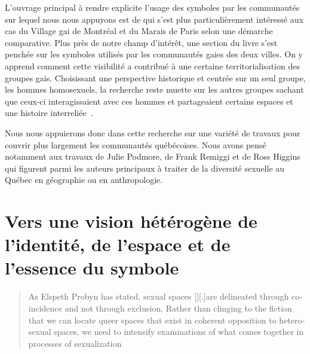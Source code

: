 L'ouvrage principal à rendre explicite l'usage des symboles par les communautés \lgbt{} sur lequel nous nous appuyons est  de \citet{Giraud2014} qui s'est plus particulièrement intéressé aux cas du Village gai de Montréal et du Marais de Paris selon une démarche comparative.
Plus près de notre champ d'intérêt, une section du livre s'est penchée sur les symboles utilisés par les communautés gaies des deux villes.
On y apprend comment cette visibilité a contribué à une certaine territorialisation des groupes gais.
Choisissant une perspective historique et centrée sur un seul groupe, les hommes homosexuels, la recherche reste muette sur les autres groupes \lgbt{} sachant que ceux-ci interagissaient avec ces hommes et partageaient certains espaces et une histoire interreliée~\citep{Remiggi2000,Demczuk1998,Podmore2001,Higgins1997,Higgins1999}.

Nous nous appuierons donc dans cette recherche sur une variété de travaux pour couvrir plus largement les communautés \lgbt{} québécoises.
Nous avons pensé notamment aux travaux de Julie Podmore, de Frank Remiggi et de Ross Higgins qui figurent parmi les auteurs principaux à traiter de la diversité sexuelle au Québec en géographie ou en anthropologie.

\section{Vers une vision hétérogène de l'identité, de l'espace et de l'essence du symbole}
\label{sec:vers_une_vision_h_t_rog_ne_de_l_identit_de_l_espace_et_de_l_essence_du_symbole}

\foreignblockquote{english}[
{\cite[tel que cité dans][97]{Oswin2008}}
][.]{As Elspeth Probyn has stated, sexual spaces [{\citeyear[10]{Probyn1996}}][.]{are delineated through coincidence and not through exclusion}. Rather than clinging to the fiction that we can locate queer spaces that exist in coherent opposition to heterosexual spaces, we need to intensify examinations of what comes together in processes of sexualization}

